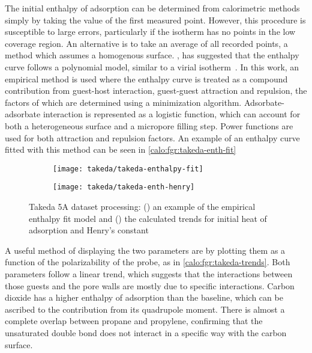 The initial enthalpy of adsorption can be determined from calorimetric 
methods simply by taking the value of the first measured point.
However, this procedure is susceptible to large errors, particularly
if the isotherm has no points in the low coverage region. An alternative
is to take an average of all recorded points, a method which assumes
a homogenous surface. \citeauthor{myersThermodynamicsAdsorptionPorous2002},
has suggested that the enthalpy curve follows a polynomial model, similar
to a virial isotherm~\cite{myersThermodynamicsAdsorptionPorous2002}.
In this work, an empirical method is used where the enthalpy curve
is treated as a compound contribution from guest-host interaction,
guest-guest attraction and repulsion, the factors of which are determined
using a minimization algorithm. Adsorbate-adsorbate interaction is 
represented as a logistic function, which can account for both 
a heterogeneous surface and a micropore filling step. Power functions
are used for both attraction and repulsion factors. An example of 
an enthalpy curve fitted with this method can be seen 
in \autoref{calo:fgr:takeda-enth-fit}

\begin{figure}[ht]

	\centering
	\begin{subfigure}[b]{.5\textwidth}
		\centering
		\texttt{[image: takeda/takeda-enthalpy-fit]}
		\caption{}%
		\label{calo:fgr:takeda-enth-fit}
	\end{subfigure}%
	\begin{subfigure}[b]{.5\textwidth}
		\centering
		\texttt{[image: takeda/takeda-enth-henry]}
		\caption{}%
		\label{calo:fgr:takeda-trends}
	\end{subfigure}
	\caption{Takeda 5A dataset processing: (\protect{})
	 an example of the empirical enthalpy fit model and (\protect{}) the calculated
		trends for initial heat of adsorption and Henry's constant}%
	\label{calo:fgr:takeda-analysis}

\end{figure}

A useful method of displaying the two parameters are by plotting them
as a function of the polarizability of the probe, as in
\autoref{calo:fgr:takeda-trends}. Both parameters follow a linear
trend, which suggests that the interactions between those guests and the pore walls are
mostly due to specific interactions. Carbon dioxide has a higher enthalpy
of adsorption than the baseline, which can be ascribed to the contribution 
from its quadrupole moment. There is almost a complete overlap between 
propane and propylene, confirming that the unsaturated double bond does not
interact in a specific way with the carbon surface.


